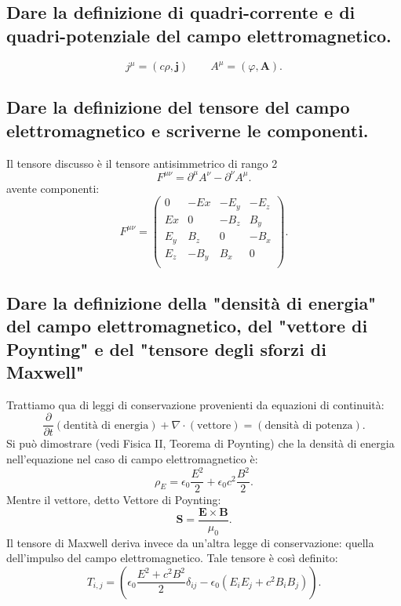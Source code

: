 \subsection[ Quadricorrente e quadripotenziale del campo E.M.]{Dare la definizione di quadri-corrente e di quadri-potenziale del campo elettromagnetico.}
\label{sec:3.a.1}
\[
	j^{\mu}=\left( c \rho, \boldsymbol{j} \right) \quad \quad 
	A^{\mu}=\left( \varphi, \boldsymbol{A}\right) 
.\] 

\subsection[ Definizione del tensore dei campi E.M.]{Dare la definizione del tensore del campo elettromagnetico e scriverne le componenti.}
\label{seq:3.a.2}
Il tensore discusso è il tensore antisimmetrico di rango 2
\[
F^{\mu \nu} = \partial^{\mu}A^{\nu} - \partial^{\nu}A^{\mu}  
.\] 
avente componenti:
\[
F^{\mu \nu}=
\left(
\begin{array}{c|ccc}
	0 & -Ex & -E_y & -E_z \\
	\hline
	Ex & 0 & -B_z & B_y \\
	E_y & B_z & 0 & -B_x \\
	E_z  & -B_y & B_x & 0 \\
\end{array}
\right)
.\] 

\subsection[ Densità di energia del campo elettromagnetico, vettore di Poynting, tensore degli sforzi]{Dare la definizione della "densità di energia" del campo elettromagnetico, del "vettore di Poynting" e del "tensore degli sforzi di Maxwell"}
Trattiamo qua di leggi di conservazione provenienti da equazioni di continuità:
\label{sec:3.a.3}
\[
	\frac{\partial}{\partial t} \left(\text{dentità di energia}\right) + \nabla \cdot \left( \text{vettore} \right) = \left( \text{densità di potenza} \right) 
.\] 
Si può dimostrare (vedi Fisica II, Teorema di Poynting) che la densità di energia nell'equazione nel caso di campo elettromagnetico è:
\[
\rho_{E}=\epsilon_0 \frac{E^2}{2}+\epsilon_0c^2 \frac{B^2}{2} 
.\] 
Mentre il vettore, detto Vettore di Poynting:
\[
\boldsymbol{S}= \frac{\boldsymbol{E}\times \boldsymbol{B}}{\mu_0}
.\] 
Il tensore di Maxwell deriva invece da un'altra legge di conservazione: quella dell'impulso del campo elettromagnetico. Tale tensore è così definito:
\[
	T_{i,j}=\left( \epsilon_0 \frac{E^2+c^2B^2}{2}\delta_{ij}-\epsilon_0\left( E_iE_j+c^2B_iB_j \right)  \right) 
.\] 
